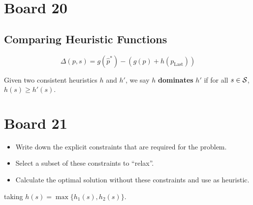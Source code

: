 \documentclass[10pt]{article}
\begin{document}
\section{Board 20}

\subsection{Comparing Heuristic Functions}

\[\Delta(p, s) = g(\hat{p}^*) - (g(p) + h(p_{\mathrm{Last}})) \] 

\begin{defn}
  Given two consistent heuristics $h$ and $h'$, we say $h$ \textbf{dominates} $h'$ if 
  for all $s\in\mathcal{S}$, $h(s) \geq h'(s)$. 
\end{defn}

\section{Board 21}

\begin{itemize}
\item Write down the explicit constraints that are required for the problem. 
\item Select a subset of these constraints to ``relax''.
\item Calculate the optimal solution without these constraints and use as heuristic.   
\end{itemize}




taking $h(s) = \max\{ h_1(s), h_2(s)\}$.

\end{document}
